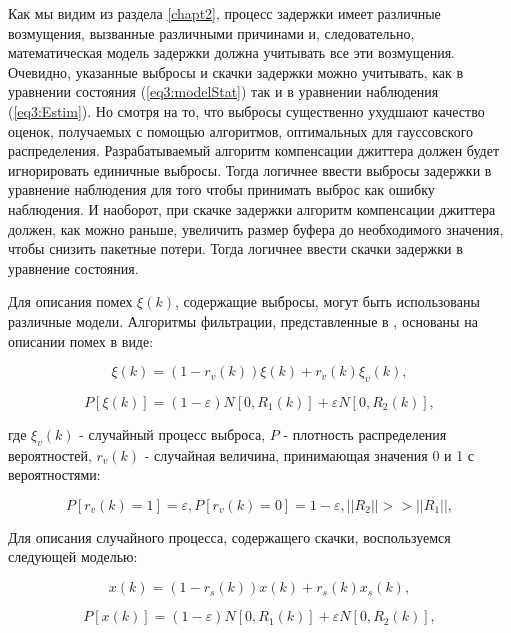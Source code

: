 Как мы видим из раздела \ref{chapt2}, процесс задержки имеет различные возмущения, вызванные различными причинами и, следовательно, математическая модель задержки должна учитывать все эти возмущения.
Очевидно, указанные выбросы и скачки задержки можно учитывать, как в уравнении состояния (\ref{eq3:modelStat}) так и в уравнении наблюдения (\ref{eq3:Estim}). Но смотря на то, что выбросы существенно ухудшают качество оценок, получаемых с помощью алгоритмов, оптимальных для гауссовского распределения. Разрабатываемый алгоритм компенсации джиттера должен будет игнорировать единичные выбросы. Тогда логичнее ввести выбросы задержки в уравнение наблюдения для того чтобы принимать выброс как ошибку наблюдения. И наоборот, при скачке задержки алгоритм компенсации джиттера должен, как можно раньше, увеличить размер буфера до необходимого значения, чтобы снизить пакетные потери. Тогда логичнее ввести скачки задержки в уравнение состояния.

Для описания помех $\xi(k)$, содержащие выбросы, могут быть использованы различные модели. Алгоритмы фильтрации, представленные в \cite{masreliez_ieee, masreliez_martin, ershov_lipcer, ershov}, основаны на описании помех в виде:


\begin{equation}\label{eq3:v}
\xi(k)=(1-r_v(k))\xi(k)+r_v(k)\xi_v(k),
\end{equation}

\begin{equation}\label{eq3:vp}
P[\xi(k)]=(1-\varepsilon)N[0,R_1(k)]+\varepsilon N[0,R_2(k)],
\end{equation}

\noindent где $\xi_v(k)$ - случайный процесс выброса, $P$ - плотность распределения вероятностей, $r_v(k)$ - случайная величина, принимающая значения 0 и 1 с вероятностями:

\begin{equation}\label{eq3:vpp}
P[r_v(k)=1]=\varepsilon, P[r_v(k)=0]=1-\varepsilon, ||R_2||>>||R_1||,
\end{equation}


Для описания случайного процесса, содержащего скачки, воспользуемся следующей моделью:

\begin{equation}\label{eq3:s}
x(k)=(1-r_s(k))x(k)+r_s(k)x_s(k),
\end{equation}

\begin{equation}\label{eq3:sp}
P[x(k)]=(1-\varepsilon)N[0,R_1(k)]+\varepsilon N[0,R_2(k)],
\end{equation}

